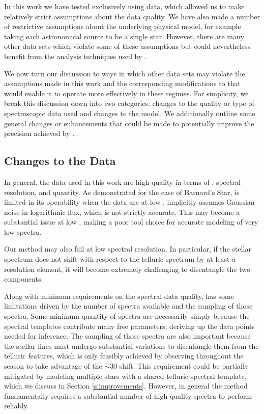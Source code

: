 \documentclass[modern]{aastex62}
\newcommand{\Mdwarf}{Barnard's Star\xspace} %
\begin{document}
In this work we have tested \wobble exclusively using \HARPS data, which allowed us to make relatively strict assumptions about the data quality.
We have also made a number of restrictive assumptions about the underlying physical model, for example taking each astronomical source to be a single star.
However, there are many other \EPRV data sets which violate some of these assumptions but could nevertheless benefit from the analysis techniques used by \wobble.

We now turn our discussion to ways in which other data sets may violate the assumptions made in this work and the corresponding modifications to \wobble that would enable it to operate more effectively in these regimes.
For simplicity, we break this discussion down into two categories: changes to the quality or type of spectroscopic data used and changes to the model.
We additionally outline some general changes or enhancements that could be made to potentially improve the \RV precision achieved by \wobble.

\subsection{Changes to the Data}
\label{s:data-changes}

In general, the data used in this work are high quality in terms of \SNR, spectral resolution, and quantity.
As demonstrated for the case of \Mdwarf, \wobble is limited in its operability when the data are at low \SNR.
\wobble implicitly assumes Gaussian noise in logarithmic flux, which is not strictly accurate.
This may become a substantial issue at low \SNR, making \wobble a poor tool choice for accurate modeling of very low \SNR spectra.

Our method may also fail at low spectral resolution.
In particular, if the stellar spectrum does not shift with respect to the telluric spectrum by at least a resolution element, it will become extremely challenging to disentangle the two components.

Along with minimum requirements on the spectral data quality, \wobble has some limitations driven by the number of spectra available and the sampling of those spectra.
Some minimum quantity of spectra are necessarily simply because the spectral templates contribute many free parameters, deriving up the data points needed for inference.
The sampling of those spectra are also important because the stellar lines must undergo substantial \RV variations to disentangle them from the telluric features, which is only feasibly achieved by observing throughout the season to take advantage of the $\sim 30$ \kms \BERV shift.
This requirement could be partially mitigated by modeling multiple stars with a shared telluric spectral template, which we discuss in Section \ref{s:improvements}.
However, in general the \wobble method fundamentally requires a substantial number of high quality spectra to perform reliably.
\end{document}
